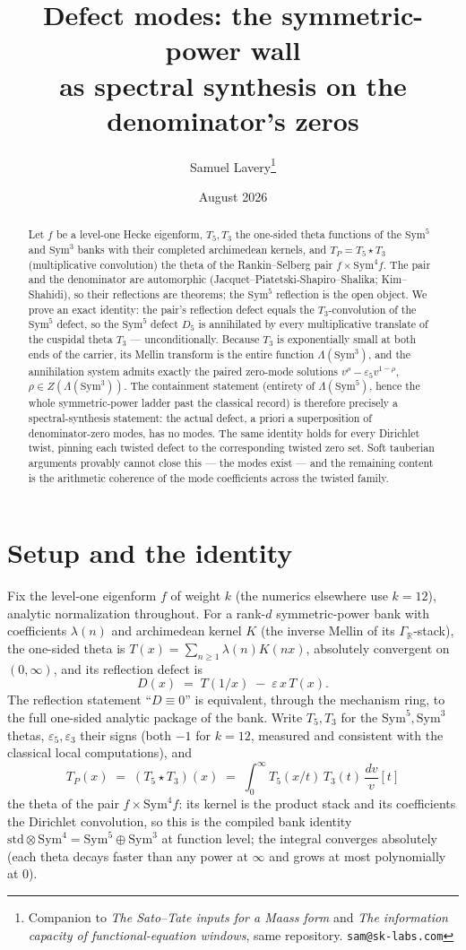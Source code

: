 \documentclass[11pt]{article}
\title{Defect modes: the symmetric-power wall\\ as spectral synthesis on the
denominator's zeros}
\author{Samuel Lavery\thanks{Companion to \emph{The Sato--Tate inputs for a
Maass form} and \emph{The information capacity of functional-equation
windows}, same repository.  \texttt{sam@sk-labs.com}}}
\date{August 2026}
\theoremstyle{remark}
\newcommand{\R}{\mathbb{R}}
\newcommand{\Sym}{\mathrm{Sym}}
\newcommand{\dv}{\,\frac{dv}{v}}
\begin{document}
\maketitle

\begin{abstract}
Let $f$ be a level-one Hecke eigenform, $T_5,T_3$ the one-sided theta
functions of the $\Sym^5$ and $\Sym^3$ banks with their completed archimedean
kernels, and $T_P=T_5\star T_3$ (multiplicative convolution) the theta of the
Rankin--Selberg pair $f\times\Sym^4 f$.  The pair and the denominator are
automorphic (Jacquet--Piatetski-Shapiro--Shalika; Kim--Shahidi), so their
reflections are theorems; the $\Sym^5$ reflection is the open object.  We
prove an exact identity: the pair's reflection defect equals the
$T_3$-convolution of the $\Sym^5$ defect, so the $\Sym^5$ defect $D_5$ is
annihilated by every multiplicative translate of the cuspidal theta $T_3$ ---
unconditionally.  Because $T_3$ is exponentially small at both ends of the
carrier, its Mellin transform is the entire function $\Lambda(\Sym^3)$, and
the annihilation system admits exactly the paired zero-mode solutions
$v^{\rho}-\varepsilon_5 v^{1-\rho}$, $\rho\in Z(\Lambda(\Sym^3))$.  The
containment statement (entirety of $\Lambda(\Sym^5)$, hence the whole
symmetric-power ladder past the classical record) is therefore precisely a
spectral-synthesis statement: the actual defect, a priori a superposition of
denominator-zero modes, has no modes.  The same identity holds for every
Dirichlet twist, pinning each twisted defect to the corresponding twisted
zero set.  Soft tauberian arguments provably cannot close this --- the modes
exist --- and the remaining content is the arithmetic coherence of the mode
coefficients across the twisted family.
\end{abstract}

\section{Setup and the identity}

Fix the level-one eigenform $f$ of weight $k$ (the numerics elsewhere use
$k=12$), analytic normalization throughout.  For a rank-$d$ symmetric-power
bank with coefficients $\lambda(n)$ and archimedean kernel $K$ (the inverse
Mellin of its $\Gamma_\R$-stack), the one-sided theta is
$T(x)=\sum_{n\ge1}\lambda(n)K(nx)$, absolutely convergent on $(0,\infty)$,
and its reflection defect is
\[
D(x)\;=\;T(1/x)\;-\;\varepsilon\,x\,T(x).
\]
The reflection statement ``$D\equiv0$'' is equivalent, through the mechanism
ring, to the full one-sided analytic package of the bank.  Write $T_5,T_3$
for the $\Sym^5,\Sym^3$ thetas, $\varepsilon_5,\varepsilon_3$ their signs
(both $-1$ for $k=12$, measured and consistent with the classical local
computations), and
\[
T_P(x)\;=\;(T_5\star T_3)(x)\;=\;\int_0^\infty T_5(x/t)\,T_3(t)\dv[t]
\]
the theta of the pair $f\times\Sym^4f$: its kernel is the product stack and
its coefficients the Dirichlet convolution, so this is the compiled bank
identity $\mathrm{std}\otimes\Sym^4=\Sym^5\oplus\Sym^3$ at function level;
the integral converges absolutely (each theta decays faster than any power
at $\infty$ and grows at most polynomially at $0$).
\end{document}
